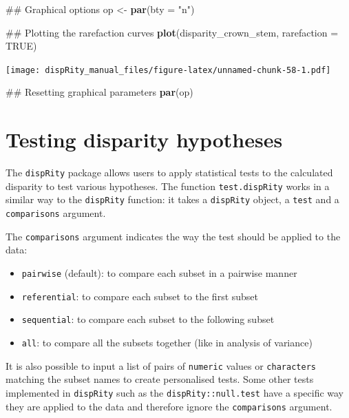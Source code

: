 \documentclass[]{book}
\newenvironment{Shaded}{\begin{snugshade}}{\end{snugshade}}
\newcommand{\KeywordTok}[1]{\textcolor[rgb]{0.13,0.29,0.53}{\textbf{#1}}}
\newcommand{\DataTypeTok}[1]{\textcolor[rgb]{0.13,0.29,0.53}{#1}}
\newcommand{\StringTok}[1]{\textcolor[rgb]{0.31,0.60,0.02}{#1}}
\newcommand{\OtherTok}[1]{\textcolor[rgb]{0.56,0.35,0.01}{#1}}
\newcommand{\NormalTok}[1]{#1}
\providecommand{\tightlist}{%
  \setlength{\itemsep}{0pt}\setlength{\parskip}{0pt}}
\theoremstyle{definition}
\theoremstyle{definition}
\theoremstyle{definition}
\theoremstyle{remark}
\begin{document}
\begin{Shaded}
\begin{Highlighting}[]
\NormalTok{## Graphical options}
\NormalTok{op <-}\StringTok{ }\KeywordTok{par}\NormalTok{(}\DataTypeTok{bty =} \StringTok{"n"}\NormalTok{)}

\NormalTok{## Plotting the rarefaction curves}
\KeywordTok{plot}\NormalTok{(disparity_crown_stem, }\DataTypeTok{rarefaction =} \OtherTok{TRUE}\NormalTok{)}
\end{Highlighting}
\end{Shaded}

\texttt{[image: dispRity\_manual\_files/figure-latex/unnamed-chunk-58-1.pdf]}

\begin{Shaded}
\begin{Highlighting}[]
\NormalTok{## Resetting graphical parameters}
\KeywordTok{par}\NormalTok{(op)}
\end{Highlighting}
\end{Shaded}

\section{Testing disparity
hypotheses}\label{testing-disparity-hypotheses}

The \texttt{dispRity} package allows users to apply statistical tests to
the calculated disparity to test various hypotheses. The function
\texttt{test.dispRity} works in a similar way to the \texttt{dispRity}
function: it takes a \texttt{dispRity} object, a \texttt{test} and a
\texttt{comparisons} argument.

The \texttt{comparisons} argument indicates the way the test should be
applied to the data:

\begin{itemize}
\tightlist
\item
  \texttt{pairwise} (default): to compare each subset in a pairwise
  manner
\item
  \texttt{referential}: to compare each subset to the first subset
\item
  \texttt{sequential}: to compare each subset to the following subset
\item
  \texttt{all}: to compare all the subsets together (like in analysis of
  variance)
\end{itemize}

It is also possible to input a list of pairs of \texttt{numeric} values
or \texttt{characters} matching the subset names to create personalised
tests. Some other tests implemented in \texttt{dispRity} such as the
\texttt{dispRity::null.test} have a specific way they are applied to the
data and therefore ignore the \texttt{comparisons} argument.
\end{document}
